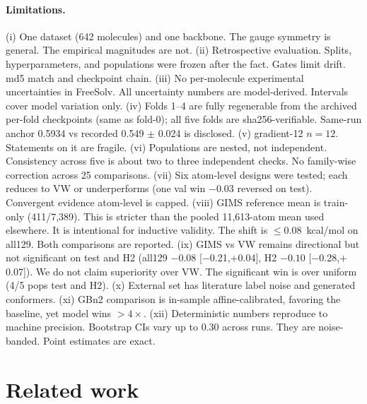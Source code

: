 \documentclass{article}
\begin{document}
\paragraph{Limitations.} (i) One dataset (642 molecules) and one backbone.
The gauge symmetry is general. The empirical magnitudes are not. (ii)
Retrospective evaluation. Splits, hyperparameters, and populations were frozen
after the fact. Gates limit drift. md5 match and checkpoint chain. (iii) No
per-molecule experimental uncertainties in FreeSolv. All uncertainty numbers
are model-derived. Intervals cover model variation only. (iv) Folds 1--4 are fully regenerable from
the archived per-fold checkpoints (same as fold-0);
all five folds are sha256-verifiable. Same-run anchor 0.5934 vs recorded
0.549 $\pm$ 0.024 is disclosed. (v) gradient-12
$n=12$. Statements on it are fragile. (vi) Populations are nested, not
independent. Consistency across five is about two to three independent checks.
No family-wise correction across 25 comparisons. (vii) Six atom-level designs were tested; each reduces to VW or underperforms (one val win $-0.03$ reversed on test). Convergent evidence atom-level is capped. (viii) GIMS reference mean is train-only (411/7{,}389).
This is stricter than the pooled 11{,}613-atom mean used elsewhere. It is
intentional for inductive validity. The shift is $\le0.08$~kcal/mol on all129.
Both comparisons are reported.
(ix) GIMS vs VW remains directional but not significant on test and H2
(all129 $-0.08$ [$-$0.21,$+$0.04], H2 $-0.10$ [$-$0.28,$+$0.07]). We do not
claim superiority over VW. The significant win is over uniform (4/5 pops
test and H2).
(x) External set has literature label noise and generated conformers. (xi)
GBn2 comparison is in-sample affine-calibrated, favoring the baseline, yet
model wins $>4\times$. (xii) Deterministic numbers reproduce to machine
precision. Bootstrap CIs vary up to 0.30 across runs. They are noise-banded.
Point estimates are exact.

\section{Related work}
\end{document}
